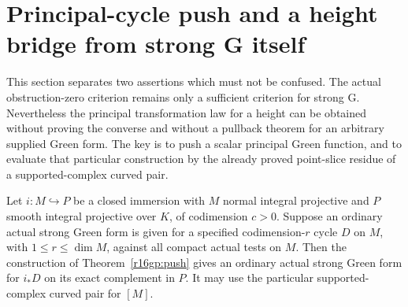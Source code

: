 \section{Principal-cycle push and a height bridge from strong G itself}
\label{r16ph:section}

This section separates two assertions which must not be confused.
The actual obstruction-zero criterion remains only a sufficient
criterion for strong G.  Nevertheless the principal transformation
law for a height can be obtained without proving the converse and
without a pullback theorem for an arbitrary supplied Green form.
The key is to push a scalar principal Green function, and to evaluate
that particular construction by the already proved point-slice residue
of a supported-complex curved pair.

\begin{lemma}
\label{r16ph:normal-immersion}
Let $i:M\hookrightarrow P$ be a closed immersion with $M$ normal
integral projective and $P$ smooth integral projective over $K$, of
codimension $c>0$.  Suppose an ordinary actual strong Green form is
given for a specified codimension-$r$ cycle $D$ on $M$, with
$1\le r\le\dim M$, against all compact actual tests on $M$.
Then the construction of Theorem~\ref{r16gp:push} gives an ordinary
actual strong Green form for $i_*D$ on its exact complement in $P$.
It may use the particular supported-complex curved pair for $[M]$.
\end{lemma}

